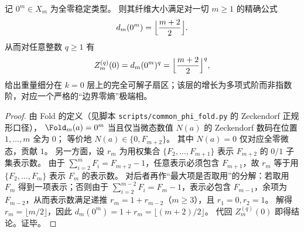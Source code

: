 \begin{conclusion}[零重量纤维的完全闭式：\texorpdfstring{$d_m(0^m)=\lfloor (m+2)/2\rfloor$}{d_m(0^m)=floor((m+2)/2)}]\label{con:xi-terminal-zero-weight-fiber-closed}
记 \(0^m\in X_m\) 为全零稳定类型。
则其纤维大小满足对一切 \(m\ge 1\) 的精确公式
\[
d_m(0^m)=\Bigl\lfloor\frac{m+2}{2}\Bigr\rfloor.
\]
从而对任意整数 \(q\ge 1\) 有
\[
Z_m^{(q)}(0)=d_m(0^m)^q=\Bigl\lfloor\frac{m+2}{2}\Bigr\rfloor^q,
\]
给出重量细分在 \(k=0\) 层上的完全可解子扇区；该层的增长为多项式阶而非指数阶，对应一个严格的“边界零熵”极端相。
\end{conclusion}
\begin{proof}
由 Fold 的定义（见脚本 \texttt{scripts/common\_phi\_fold.py} 的 Zeckendorf 正规形口径），
\(\Fold_m(a)=0^m\) 当且仅当微态数值 \(N(a)\) 的 Zeckendorf 数码在位置 \(1,\dots,m\) 全为 \(0\)；
等价地 \(N(a)\in\{0,F_{m+2}\}\)。
其中 \(N(a)=0\) 仅对应全零微态，贡献 \(1\)。
另一方面，设 \(r_m\) 为用权集合 \(\{F_2,\dots,F_{m+1}\}\) 表示 \(F_{m+2}\) 的 \(0/1\) 子集表示数。
由于 \(\sum_{i=2}^{m}F_i=F_{m+2}-1\)，任意表示必须包含 \(F_{m+1}\)，故 \(r_m\) 等于用 \(\{F_2,\dots,F_m\}\) 表示 \(F_m\) 的表示数。
对后者再作“最大项是否取用”的分解：若取用 \(F_m\) 得到一项表示；否则由于 \(\sum_{i=2}^{m-2}F_i=F_m-1\)，表示必包含 \(F_{m-1}\)，余项为 \(F_{m-2}\)，从而表示数满足递推 \(r_m=1+r_{m-2}\)（\(m\ge 3\)），且 \(r_1=0,r_2=1\)。
解得 \(r_m=\lfloor m/2\rfloor\)，因此
\(
d_m(0^m)=1+r_m=\lfloor (m+2)/2\rfloor
\)。
代回 \(Z_m^{(q)}(0)\) 即得结论。证毕。
\end{proof}

